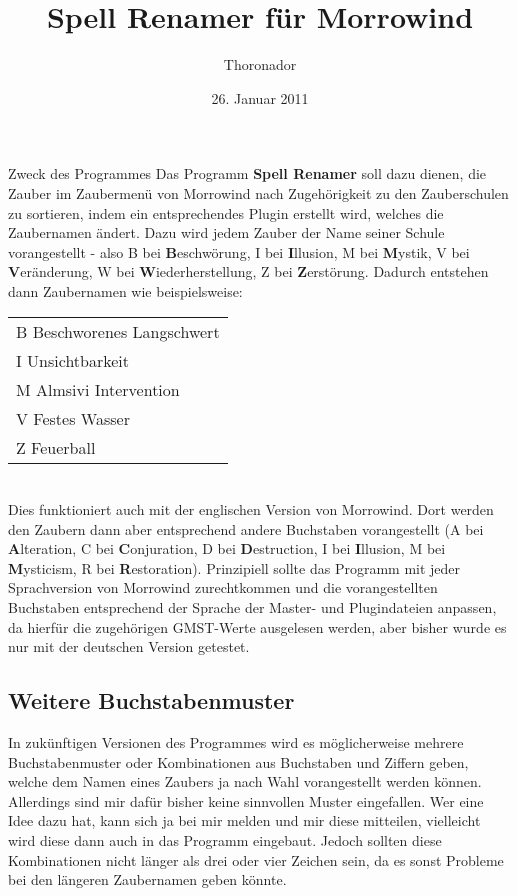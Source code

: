 \documentclass[12pt,oneside,a4paper]{article}
\title{Spell Renamer f\"{u}r Morrowind}
\author{Thoronador}
\date{26. Januar 2011}
\begin{document}
\maketitle

\begin{section}{Zweck des Programmes}
Das Programm \textbf{Spell Renamer} soll dazu dienen, die Zauber im Zaubermen\"{u}
von Morrowind nach Zugeh\"{o}rigkeit zu den Zauberschulen zu sortieren, indem
ein entsprechendes Plugin erstellt wird, welches die Zaubernamen \"{a}ndert.
Dazu wird jedem Zauber der Name seiner Schule vorangestellt - also B bei
\textbf{B}eschw\"{o}rung, I bei \textbf{I}llusion, M bei \textbf{M}ystik, V bei
\textbf{V}er\"{a}nderung, W bei \textbf{W}iederherstellung, Z bei
\textbf{Z}erst\"{o}rung.
Dadurch entstehen dann Zau\-ber\-na\-men wie beispielsweise:\\

\begin{tabular}{l}
B Beschworenes Langschwert\\
I Unsichtbarkeit\\
M Almsivi Intervention\\
V Festes Wasser\\
Z Feuerball\\
\end{tabular}
\\

Dies funktioniert auch mit der englischen Version von Morrowind. Dort werden
den Zaubern dann aber entsprechend andere Buchstaben vorangestellt (A bei
\textbf{A}lteration, C bei \textbf{C}onjuration, D bei \textbf{D}estruction,
I bei \textbf{I}llusion, M bei \textbf{M}ysticism, R bei \textbf{R}estoration).
Prinzipiell sollte das Programm mit jeder Sprachversion von Morrowind zurechtkommen
und die vorangestellten Buchstaben entsprechend der Sprache der Master- und
Plugindateien anpassen, da hierf\"{u}r die zugeh\"{o}rigen GMST-Werte ausgelesen werden,
aber bisher wurde es nur mit der deutschen Version getestet.

\subsection{Weitere Buchstabenmuster}
In zuk\"{u}nftigen Versionen des Programmes wird es m\"{o}glicherweise mehrere
Buchstabenmuster oder Kombinationen aus Buchstaben und Ziffern geben, welche
dem Namen eines Zaubers ja nach Wahl vorangestellt werden k\"{o}nnen. Allerdings
sind mir daf\"{u}r bisher keine sinnvollen Muster eingefallen. Wer eine Idee dazu
hat, kann sich ja bei mir melden und mir diese mitteilen, vielleicht wird diese
dann auch in das Programm eingebaut. Jedoch sollten diese Kombinationen nicht
l\"{a}nger als drei oder vier Zeichen sein, da es sonst Probleme bei den l\"{a}ngeren
Zaubernamen geben k\"{o}nnte.


\end{section}
\end{document}
